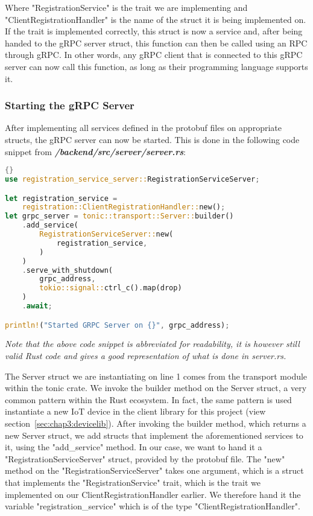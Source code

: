 Where "RegistrationService" is the trait we are implementing and "ClientRegistrationHandler" is the name of the struct it is being implemented on. If the trait is implemented correctly, this struct is now a service and, after being handed to the gRPC server struct, this function can then be called using an RPC through gRPC. In other words, any gRPC client that is connected to this gRPC server can now call this function, as long as their programming language supports it.

\subsubsection{Starting the gRPC Server}
After implementing all services defined in the protobuf files on appropriate structs, the gRPC server can now be started. This is done in the following code snippet from \textit{\textbf{/backend/src/server/server.rs}}:
\begin{lstlisting}[language=Rust, style=boxed, showstringspaces=false]{}
use registration_service_server::RegistrationServiceServer;

let registration_service =
    registration::ClientRegistrationHandler::new();
let grpc_server = tonic::transport::Server::builder()
    .add_service(
        RegistrationServiceServer::new(
            registration_service,
        )
    )
    .serve_with_shutdown(
        grpc_address,
        tokio::signal::ctrl_c().map(drop)
    )
    .await;

println!("Started GRPC Server on {}", grpc_address);
\end{lstlisting}
\textit{Note that the above code snippet is abbreviated for readability, it is however still valid Rust code and gives a good representation of what is done in server.rs.} 

The Server struct we are instantiating on line 1 comes from the transport module within the tonic crate. We invoke the builder method on the Server struct, a very common pattern within the Rust ecosystem. In fact, the same pattern is used instantiate a new IoT device in the client library for this project (view section~\ref{sec:chap3:devicelib}). After invoking the builder method, which returns a new Server struct, we add structs that implement the aforementioned services to it, using the "add\_service" method. In our case, we want to hand it a "RegistrationServiceServer" struct, provided by the protobuf file. The "new" method on the "RegistrationServiceServer" takes one argument, which is a struct that implements the "RegistrationService" trait, which is the trait we implemented on our ClientRegistrationHandler earlier. We therefore hand it the variable "registration\_service" which is of the type "ClientRegistrationHandler".


